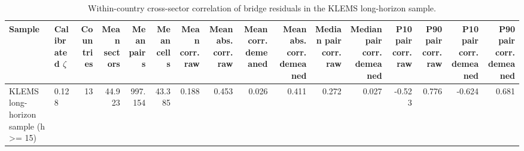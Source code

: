 \begin{table}[!htbp]
\centering
\caption{Within-country cross-sector correlation of bridge residuals in the KLEMS long-horizon sample.}
\label{tab:within-country-bridge-residual-summary}
\begin{tabular}{llrrrrrrrrrrrrrr}
\hline
Sample & Calibrated $\zeta$ & Countries & Mean sectors & Mean pairs & Mean cells & Mean corr. raw & Mean abs. corr. raw & Mean corr. demeaned & Mean abs. corr. demeaned & Median pair corr. raw & Median pair corr. demeaned & P10 pair corr. raw & P90 pair corr. raw & P10 pair corr. demeaned & P90 pair corr. demeaned \\
\hline
KLEMS long-horizon sample (h >= 15) & 0.128 & 13 & 44.923 & 997.154 & 43.385 & 0.188 & 0.453 & 0.026 & 0.411 & 0.272 & 0.027 & -0.523 & 0.776 & -0.624 & 0.681 \\
\hline
\end{tabular}
\end{table}
